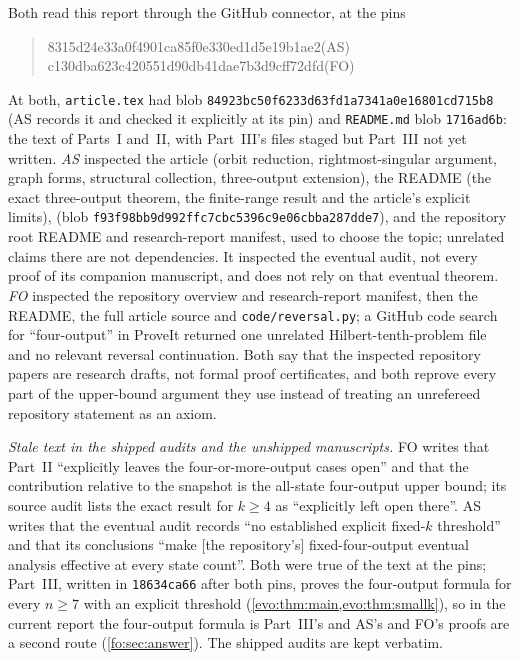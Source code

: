 \documentclass[11pt,a4paper]{article}
\numberwithin{equation}{section}
\theoremstyle{definition}
\theoremstyle{remark}
\begin{document}
Both read this report through the GitHub connector, at the pins
\begin{quote}\small\ttfamily
8315d24e33a0f4901ca85f0e330ed1d5e19b1ae2\hfill\normalfont(AS)\\
c130dba623c420551d90db41dae7b3d9cff72dfd\hfill\normalfont(FO)
\end{quote}
At both, \texttt{article.tex} had blob
\texttt{84923bc50f6233d63fd1a7341a0e16801cd715b8} (AS records it and checked
it explicitly at its pin) and \texttt{README.md} blob \texttt{1716ad6b}: the
text of Parts~I and~II, with Part~III's files staged but Part~III not yet
written. \emph{AS} inspected the article (orbit reduction, rightmost-singular
argument, graph forms, structural collection, three-output extension), the
README (the exact three-output theorem, the finite-range result and the
article's explicit limits),  (blob
\texttt{f93f98bb9d992ffc7cbc5396c9e06cbba287dde7}), and the repository root
README and research-report manifest, used to choose the topic; unrelated claims
there are not dependencies. It inspected the eventual audit, not every proof of
its companion manuscript, and does not rely on that eventual theorem. \emph{FO}
inspected the repository overview and research-report manifest, then the
README, the full article source and \texttt{code/reversal.py}; a GitHub code
search for ``four-output'' in ProveIt returned one unrelated
Hilbert-tenth-problem file and no relevant reversal continuation. Both say
that the inspected repository papers are research drafts, not formal proof
certificates, and both reprove every part of the upper-bound argument they use
instead of treating an unrefereed repository statement as an axiom.

\emph{Stale text in the shipped audits and the unshipped manuscripts.} FO
writes that Part~II ``explicitly leaves the four-or-more-output cases open''
and that the contribution relative to the snapshot is the all-state
four-output upper bound; its source audit lists the exact result for $k\ge4$
as ``explicitly left open there''. AS writes that the eventual audit records
``no established explicit fixed-$k$ threshold'' and that its conclusions ``make
[the repository's] fixed-four-output eventual analysis effective at every state
count''. Both were true of the text at the pins; Part~III, written in
\texttt{18634ca66} after both pins, proves the four-output formula for every
$n\ge7$ with an explicit threshold (\cref{evo:thm:main,evo:thm:smallk}), so in
the current report the four-output formula is Part~III's and AS's and FO's
proofs are a second route (\cref{fo:sec:answer}). The shipped audits are kept
verbatim.
\end{document}
